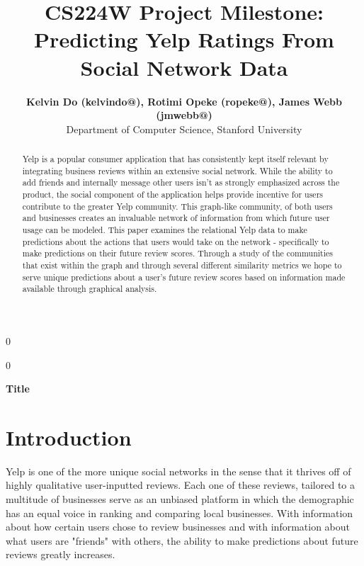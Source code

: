\documentclass[10pt]{article}
\newcommand{\blind}{0}
\begin{document}
%

\def\spacingset#1{\renewcommand{\baselinestretch}%
{#1}\small\normalsize} \spacingset{1}



\blind
{
  \title{\bf CS224W Project Milestone: Predicting Yelp Ratings From Social Network Data}
  \author{\textbf{Kelvin Do (kelvindo@), Rotimi Opeke (ropeke@), James Webb (jmwebb@)} \hspace{.2cm}\\
    Department of Computer Science, Stanford University}
  \maketitle
} \fi

\blind
{
  \bigskip
  \bigskip
  \bigskip
  \begin{center}
    {\LARGE\bf Title}
\end{center}
  \medskip
} \fi

\bigskip

\begin{abstract}
Yelp is a popular consumer application that has consistently kept itself relevant by integrating business reviews within an extensive social network. While the ability to add friends and internally message other users isn't as strongly emphasized across the product, the social component of the application helps provide incentive for users contribute to the greater Yelp community. This graph-like community, of both users and businesses creates an invaluable network of information from which future user usage can be modeled. This paper examines the relational Yelp data to make predictions about the actions that users would take on the network - specifically to make predictions on their future review scores. Through a study of the communities that exist within the graph and through several different similarity metrics we hope to serve unique predictions about a user's future review scores based on information made available through graphical analysis.
\end{abstract}

\spacingset{1}
\section{Introduction}
\label{sec:intro}
Yelp is one of the more unique social networks in the sense that it thrives off of highly qualitative user-inputted reviews. Each one of these reviews, tailored to a multitude of businesses serve as an unbiased platform in which the demographic has an equal voice in ranking and comparing local businesses.  With information about how certain users chose to review businesses and with information about what users are "friends" with others, the ability to make predictions about future reviews greatly increases.\\
\end{document}
